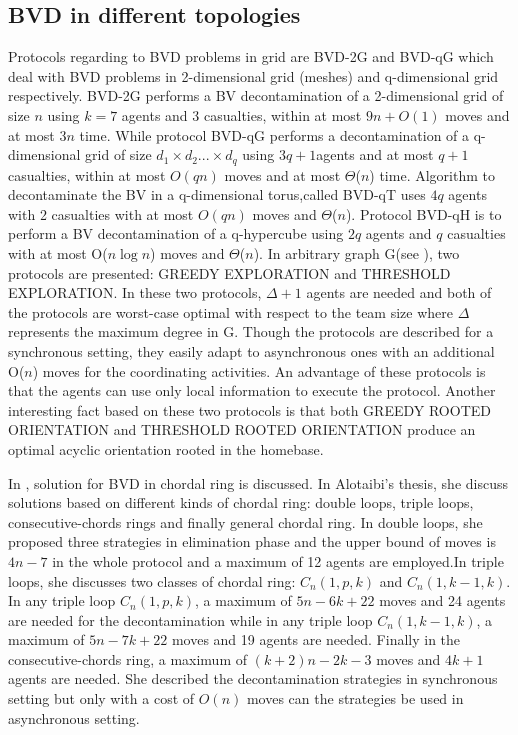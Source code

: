 \subsection{BVD in different topologies}
Protocols regarding to BVD problems in grid are BVD-2G and BVD-qG which deal with BVD problems in 2-dimensional grid (meshes) and q-dimensional grid respectively. BVD-2G performs a BV decontamination of a 2-dimensional grid of size $n$ using $k=7$ agents and 3 casualties, within at most $9n+O(1)$ moves and at most $3n$ time. While protocol BVD-qG performs a decontamination of a q-dimensional grid of size $d_1\times d_2 ...\times d_q$ using $3q+1$agents and at most $q+1$ casualties, within at most $O(qn)$ moves and at most $\Theta$($n$) time. Algorithm to decontaminate the BV in a q-dimensional torus,called BVD-qT uses $4q$ agents with 2 casualties with at most $O(qn)$ moves and $\Theta$($n$). Protocol BVD-qH is to perform a BV decontamination of a q-hypercube using $2q$ agents and $q$ casualties with at most O($n\log n$) moves and $\Theta$($n$). In arbitrary graph G(see \cite{Cai1}), two protocols are presented: GREEDY EXPLORATION and THRESHOLD EXPLORATION. In these two protocols, $\Delta +1$ agents are needed and both of the protocols are worst-case optimal with respect to the team size where $\Delta$ represents the maximum degree in G. Though the protocols are described for a synchronous setting, they easily adapt to asynchronous ones with an additional O($n$) moves for the coordinating activities. An advantage of these protocols is that the agents can use only local information to execute the protocol. Another interesting fact based on these two protocols is that both GREEDY ROOTED ORIENTATION and THRESHOLD ROOTED ORIENTATION produce an optimal acyclic orientation rooted in the homebase.

In \cite{Alotaibi}, solution for BVD in chordal ring is discussed. In Alotaibi's thesis, she discuss solutions based on different kinds of chordal ring: double loops, triple loops, consecutive-chords rings and finally general chordal ring. In double loops, she proposed three strategies in elimination phase and the upper bound of moves is $4n-7$ in the whole protocol and a maximum of 12 agents are employed.In triple loops, she discusses two classes of chordal ring: $C_n(1,p,k)$ and $C_n(1,k-1,k)$. In any triple loop $C_n(1,p,k)$, a maximum of $5n-6k+22$ moves and 24 agents are needed for the decontamination while in any triple loop $C_n(1,k-1,k)$, a maximum of $5n-7k+22$ moves and 19 agents are needed. Finally in the consecutive-chords ring, a maximum of $(k+2)n-2k-3$ moves and $4k+1$ agents are needed. She described the decontamination strategies in synchronous setting but only with a cost of $O(n)$ moves can the strategies be used in asynchronous setting.







 









